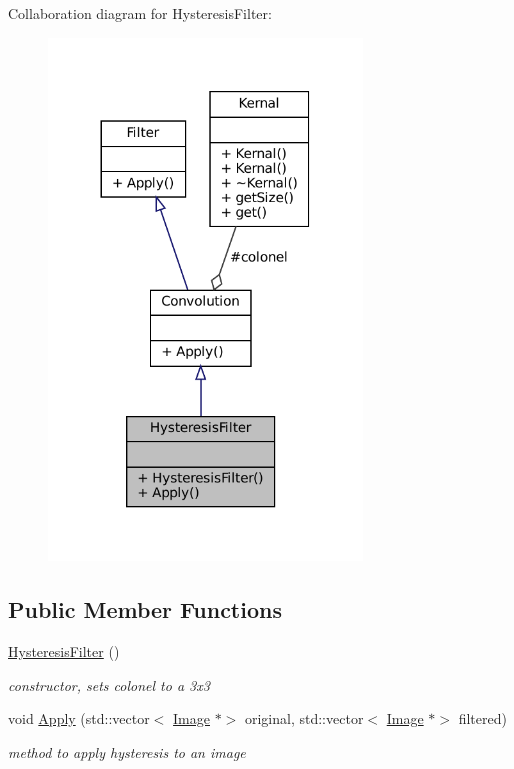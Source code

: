 Collaboration diagram for Hysteresis\+Filter\+:
\nopagebreak
\begin{figure}[H]
\begin{center}
\leavevmode
\includegraphics[width=236pt]{classHysteresisFilter__coll__graph}
\end{center}
\end{figure}
\subsection*{Public Member Functions}
\begin{DoxyCompactItemize}
\item 
\mbox{\label{classHysteresisFilter_afe7c944e6233cc9c698868d683f5083d}} 
\hyperlink{classHysteresisFilter_afe7c944e6233cc9c698868d683f5083d}{Hysteresis\+Filter} ()
\begin{DoxyCompactList}\small\item\em constructor, sets colonel to a 3x3 \end{DoxyCompactList}\item 
\mbox{\label{classHysteresisFilter_af2d6c50bc0cfd609fbf7e90f01b03b1f}} 
void \hyperlink{classHysteresisFilter_af2d6c50bc0cfd609fbf7e90f01b03b1f}{Apply} (std\+::vector$<$ \hyperlink{classImage}{Image} $\ast$$>$ original, std\+::vector$<$ \hyperlink{classImage}{Image} $\ast$$>$ filtered)
\begin{DoxyCompactList}\small\item\em method to apply hysteresis to an image \end{DoxyCompactList}\end{DoxyCompactItemize}

